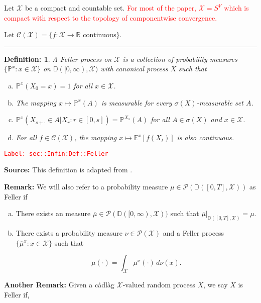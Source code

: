 \documentclass[12pt]{article}
\newcommand{\mb}{\mathbb}
\newcommand{\mc}{\mathcal}
\newcommand{\ra}{\rightarrow}
\newcommand{\ov}{\overline}
\newcommand{\te}{\text}
\newcommand{\tr}{\textcolor{red}}
\newcommand{\labe}[1]{\tr{\texttt{Label: #1}}}
\newcommand{\lin}{\rule{\linewidth}{0.4 pt}}
\newcommand{\pr}{\mb{P}}							%
\newcommand{\cad}{\mb{D}}							%
\newcommand{\X}{X}								%
\newtheorem{defn}[thms]{Definition: }
\begin{document}
Let \(\mc{X}\) be a compact and countable set. \tr{For most of the paper, \(\mc{X} = S^V\) which is compact with respect to the topology of componentwise convergence.}

Let \(\mc{C}(\mc{X})= \{f:\mc{X} \ra \mb{R} \te{ continuous}\}\).

\lin

\begin{defn}
A Feller process on \(\mc{X}\) is a collection of probability measures \(\{\pr^x:x \in \mc{X}\}\) on \(\cad([0,\infty),\mc{X})\) with canonical process \(X\) such that

\begin{enumerate}[(a)]
\item \(\pr^x(X_0 = x) = 1\) for all \(x \in \mc{X}\).

\item The mapping \(x \mapsto \pr^x(A)\) is measurable for every \(\sigma(X)\)-measurable set \(A\).

\item \(\pr^x(X_{s+\cdot} \in A|X_r:r \in [0,s]) = \pr^{X_s}(A)\) for all \(A \in \sigma(X)\) and \(x \in \mc{X}\).

\item For all \(f\in \mc{C}(\mc{X})\), the mapping \(x\mapsto \mb{E}^x[f(X_t)]\) is also continuous.
\end{enumerate}
\label{sec::Infin:Def::Feller}
\end{defn}
\labe{sec::Infin:Def::Feller}

\textbf{Source: } This definition is adapted from \cite[Definition 1.1,1.2]{Lig85}.

\textbf{Remark: } We will also refer to a probability measure \(\mu \in \mc{P}(\cad([0,T],\mc{X}))\) as Feller if

\begin{enumerate}[(a)]
\item There exists an measure \(\ov{\mu}\in \mc{P}(\cad([0,\infty),\mc{X}))\) such that \(\ov{\mu}|_{\cad([0,T],\mc{X})} = \mu\).

\item There exists a probability measure \(\nu\in \mc{P}(\mc{X})\) and a Feller process \(\{\ov{\mu}^x:x \in \mc{X}\}\) such that 

\[\ov{\mu}(\cdot) = \int_{\mc{X}} \ov{\mu}^x(\cdot)\,d\nu(x).\]
\end{enumerate}

\textbf{Another Remark: } Given a c\`adl\`ag \(\mc{X}\)-valued random process \(\X{}{}\), we say \(\X{}{}\) is Feller if,
\end{document}

